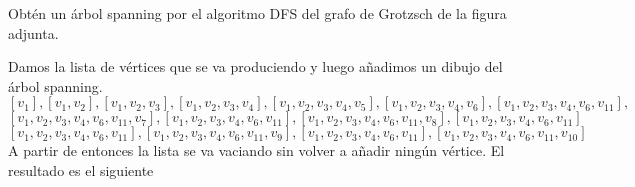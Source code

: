 \documentclass[twoside]{article}
\begin{document}
\begin{ejercicio}{1.8}
Obtén un árbol spanning por el algoritmo DFS del grafo de Grotzsch de la figura adjunta.
\end{ejercicio}
\begin{solucion}

Damos la lista de vértices que se va produciendo y luego añadimos un dibujo del árbol spanning. 
\[
[v_1], [v_1,v_2], [v_1,v_2,v_3], [v_1,v_2, v_3, v_4], [v_1,v_2, v_3, v_4, v_5], [v_1,v_2, v_3, v_4, v_6], [v_1,v_2, v_3, v_4, v_6, v_{11}], 
\]
\[
[v_1,v_2, v_3, v_4, v_6, v_{11}, v_7], [v_1,v_2, v_3, v_4, v_6, v_{11}], [v_1,v_2, v_3, v_4, v_6, v_{11}, v_8], [v_1,v_2, v_3, v_4, v_6, v_{11}]
\]
\[
[v_1,v_2, v_3, v_4, v_6, v_{11}], [v_1,v_2, v_3, v_4, v_6, v_{11}, v_9], [v_1,v_2, v_3, v_4, v_6, v_{11}], [v_1,v_2, v_3, v_4, v_6, v_{11}, v_{10}]
\]
A partir de entonces la lista se va vaciando sin volver a añadir ningún vértice. El resultado es el siguiente


\end{solucion}
\end{document}
